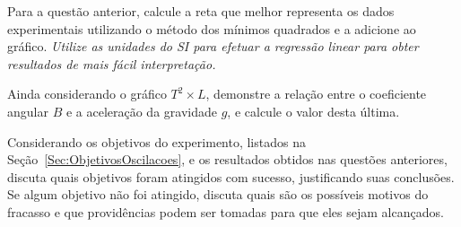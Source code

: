 \begin{question}[type={exam}]{1}
Para a questão anterior, calcule a reta que melhor representa os dados experimentais utilizando o método dos mínimos quadrados e a adicione ao gráfico. \emph{Utilize as unidades do SI para efetuar a regressão linear para obter resultados de mais fácil interpretação.}
\end{question}

\begin{question}[type={exam}]{1}
Ainda considerando o gráfico $T^2 \times L$, demonstre a relação entre o coeficiente angular $B$ e a aceleração da gravidade $g$, e calcule o valor desta última.
\end{question}

\begin{question}[type={exam}]{1.5}
Considerando os objetivos do experimento, listados na Seção~\ref{Sec:ObjetivosOscilacoes}, e os resultados obtidos nas questões anteriores, discuta quais objetivos foram atingidos com sucesso, justificando suas conclusões. Se algum objetivo não foi atingido, discuta quais são os possíveis motivos do fracasso e que providências podem ser tomadas para que eles sejam alcançados.
\end{question}

